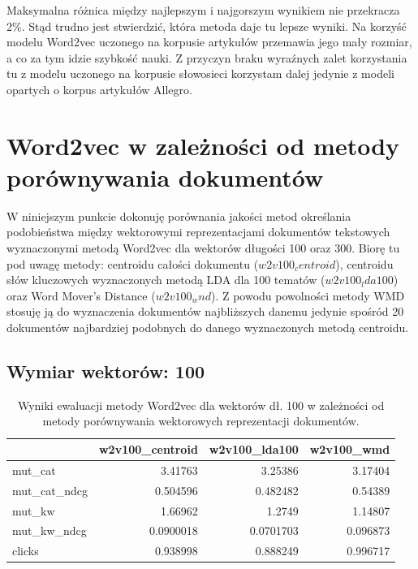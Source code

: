 \documentclass[pl]{minipw} %
\begin{document}
Maksymalna różnica między najlepszym i najgorszym wynikiem nie przekracza 2\%. Stąd trudno jest stwierdzić, która metoda daje tu lepsze wyniki. Na korzyść modelu Word2vec uczonego na korpusie artykułów przemawia jego mały rozmiar, a co za tym idzie szybkość nauki. Z przyczyn braku wyraźnych zalet korzystania tu z modelu uczonego na korpusie słowosieci korzystam dalej jedynie z modeli opartych o korpus artykułów Allegro.

\section{Word2vec w zależności od metody porównywania dokumentów}

W niniejszym punkcie dokonuję porównania jakości metod określania podobieństwa między wektorowymi reprezentacjami dokumentów tekstowych wyznaczonymi metodą Word2vec dla wektorów długości 100 oraz 300. Biorę tu pod uwagę metody: centroidu całości dokumentu ($w2v100_centroid$), centroidu słów kluczowych wyznaczonych metodą LDA dla 100 tematów ($w2v100_lda100$) oraz Word Mover's Distance ($w2v100_wnd$). Z powodu powolności metody WMD stosuję ją do wyznaczenia dokumentów najbliższych danemu jedynie spośród 20 dokumentów najbardziej podobnych do danego wyznaczonych metodą centroidu.

\subsection{Wymiar wektorów: 100}

\begin{table}[H]
	\centering
	\begin{tabular}{lrrr}
		\hline
		&   w2v100\_centroid &   w2v100\_lda100 &   w2v100\_wmd \\
		\hline
		mut\_cat      &         3.41763   &       3.25386   &     3.17404  \\
		mut\_cat\_ndcg &         0.504596  &       0.482482  &     0.54389  \\
		mut\_kw       &         1.66962   &       1.2749    &     1.14807  \\
		mut\_kw\_ndcg  &         0.0900018 &       0.0701703 &     0.096873 \\
		clicks       &         0.938998  &       0.888249  &     0.996717 \\
		\hline
	\end{tabular}
	\caption{Wyniki ewaluacji metody Word2vec dla wektorów dł. 100 w zależności od metody porównywania wektorowych reprezentacji dokumentów.}
\end{table}
\end{document}
